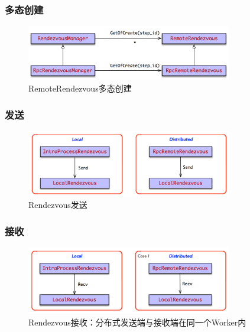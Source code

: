 \begin{content}
\subsubsection{多态创建}

\begin{figure}[H]
\centering
\includegraphics[width=0.8\textwidth]{figures/rendezvous-remote-mgr.png}
\caption{RemoteRendezvous多态创建}
 \label{fig:rendezvous-remote-mgr}
\end{figure}

\subsubsection{发送}

\begin{figure}[H]
\centering
\includegraphics[width=0.8\textwidth]{figures/rendzvous-send.png}
\caption{Rendezvous发送}
 \label{fig:rendzvous-send}
\end{figure}

\subsubsection{接收}

\begin{figure}[H]
\centering
\includegraphics[width=0.8\textwidth]{figures/rendezvous-recv-case-1.png}
\caption{Rendezvous接收：分布式发送端与接收端在同一个Worker内}
 \label{fig:rendezvous-recv-case-1}
\end{figure}


\end{content}
